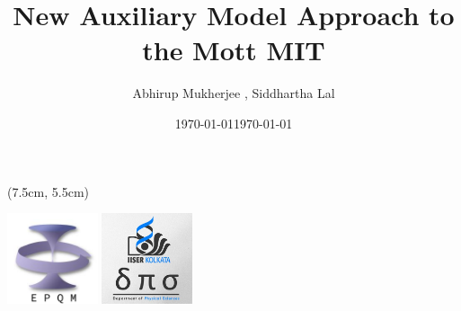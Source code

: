 \documentclass[aspectratio=169]{beamer}
\title{
{New Auxiliary Model Approach to the Mott MIT
}
}
\date{\today}
\author{\large Abhirup Mukherjee \inst{1}, Siddhartha Lal \inst{1}}
\institute{\small\inst{1} Department of Physical Sciences,IISER Kolkata}
\date{\large\today}
\begin{document}
\begin{frame}[noframenumbering]
\maketitle
\begin{textblock*}{0.7\textwidth}(7.5cm, 5.5cm)
	\centering
	\vspace*{\fill}

	\hspace*{\fill}
	\includegraphics[width=0.2\textwidth]{figures/epqm_logo_mod.jpeg}
	\includegraphics[width=0.2\textwidth]{figures/dps_logo.jpeg}
	\hspace*{\fill}

	\vspace*{\fill}
\end{textblock*}
\end{frame}
\end{document}
